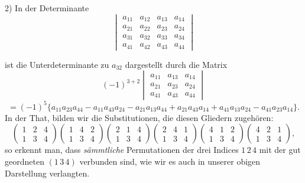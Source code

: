 2) In der Determinante
\[
\begin{vmatrix}
a_{11} & a_{12} & a_{13} & a_{14} \\
a_{21} & a_{22} & a_{23} & a_{24} \\
a_{31} & a_{32} & a_{33} & a_{34} \\
a_{41} & a_{42} & a_{43} & a_{44}
\end{vmatrix}
\]


ist die Unterdeterminante zu $a_{32}$ dargestellt durch die Matrix
\[
(-1)^{3+2}\begin{vmatrix} a_{11} & a_{13} & a_{14} \\ a_{21} & a_{23} & a_{24} \\ a_{41} & a_{43} & a_{44} \end{vmatrix}
\]
\[
=(-1)^5\{a_{11}a_{23}a_{44}-a_{11}a_{43}a_{24}-a_{21}a_{13}a_{44}+a_{21}a_{43}a_{14}+a_{41}a_{13}a_{24}-a_{41}a_{23}a_{14}\}.
\]
In der That, bilden wir die Substitutionen, die diesen Gliedern zugehören:
\[
\begin{pmatrix} 1 & 2 & 4 \\ 1 & 3 & 4 \end{pmatrix}
\begin{pmatrix} 1 & 4 & 2 \\ 1 & 3 & 4 \end{pmatrix}
\begin{pmatrix} 2 & 1 & 4 \\ 1 & 3 & 4 \end{pmatrix}
\begin{pmatrix} 2 & 4 & 1 \\ 1 & 3 & 4 \end{pmatrix}
\begin{pmatrix} 4 & 1 & 2 \\ 1 & 3 & 4 \end{pmatrix}
\begin{pmatrix} 4 & 2 & 1 \\ 1 & 3 & 4 \end{pmatrix},
\]
so erkennt man, dass \textit{sämmtliche} Permutationen der drei Indices
$1\,2\,4$ mit der gut geordneten $(1\,3\,4)$ verbunden sind, wie wir es auch
in unserer obigen Darstellung verlangten.

